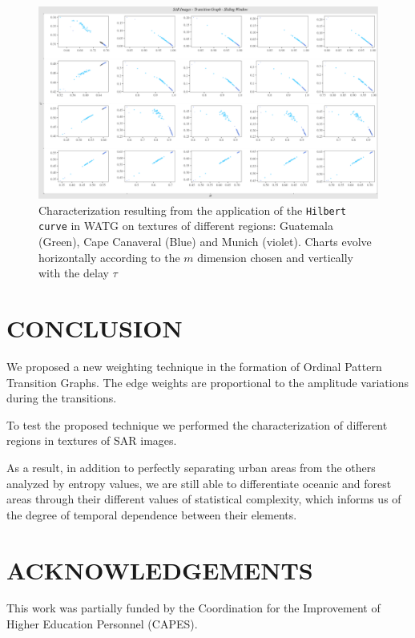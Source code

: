 \documentclass{isprs}
\begin{document}
	\begin{figure}
		\centering
		\includegraphics[width=1.05\textwidth]{Figures/transitionGraphHilbert.pdf}
		\caption{Characterization resulting from the application of the \texttt{Hilbert curve} in WATG on textures of different regions: Guatemala (Green), Cape Canaveral (Blue) and Munich (violet). Charts evolve horizontally according to the $m$ dimension chosen and vertically with the delay $\tau$}
		\label{fig:Regions}
	\end{figure}
	
	
	
	\section{CONCLUSION}\label{Conclusion}
	
	We proposed a new weighting technique in the formation of Ordinal Pattern Transition Graphs.
	The edge weights are proportional to the amplitude variations during the transitions.
	
	To test the proposed technique we performed the characterization of different regions in textures of SAR images.
	
	As a result, in addition to perfectly separating urban areas from the others analyzed by entropy values, we are still able to differentiate oceanic and forest areas through their different values of statistical complexity, which informs us of the degree of temporal dependence between their elements.
	
	
	
	
	\section*{ACKNOWLEDGEMENTS}\label{ACKNOWLEDGEMENTS}
	
	This work was partially funded by the Coordination for the Improvement of Higher Education Personnel (CAPES).
	
	
\end{document}
